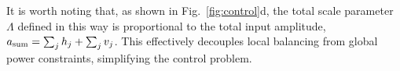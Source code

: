 It is worth noting that, as shown in Fig.~\ref{fig:control}d, the total scale parameter $\Lambda$ defined in this way is proportional to the total input amplitude, $a_{\textnormal{sum}} = \sum_j h_j + \sum_j v_j$. This effectively decouples local balancing from global power constraints, simplifying the control problem.

